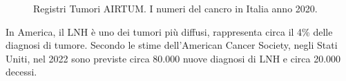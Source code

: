 \begin{figure}[H]
    \begin{center}
    \vspace{-3mm}
    \end{center}
    \caption{Registri Tumori AIRTUM. I numeri del cancro in Italia anno 2020.
    \cite{img5}}

\end{figure}

In America, il LNH è uno dei tumori più diffusi, rappresenta circa il 4\% delle diagnosi di tumore\cite{Americanstatistic}. 
Secondo le stime dell’American Cancer Society, negli Stati Uniti, nel 2022 sono previste circa 80.000 nuove 
diagnosi di LNH e circa 20.000 decessi.

